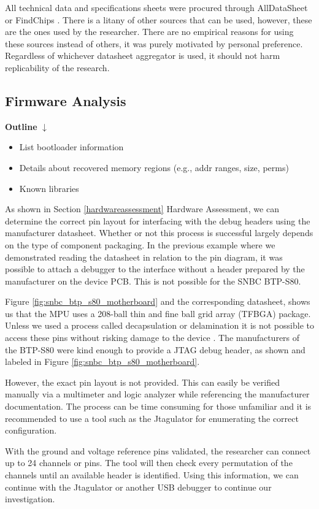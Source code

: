 All technical data and specifications sheets were procured through AllDataSheet or FindChips \autocite{ALLDATASHEETCOMElectronic,FindchipsElectronicPart}. There is a litany of other sources that can be used, however, these are the ones used by the researcher. There are no empirical reasons for using these sources instead of others, it was purely motivated by personal preference. Regardless of whichever datasheet aggregator is used, it should not harm replicability of the research.

\subsection{Firmware Analysis} \label{firmwareanalysis}

\textbf{Outline}
$\downarrow$

\begin{itemize}
    \item List bootloader information
    \item Details about recovered memory regions (e.g., addr ranges, size, perms)
    \item Known libraries
\end{itemize}

As shown in Section \ref{hardwareassessment} Hardware Assessment, we can determine the correct pin layout for interfacing with the debug headers using the manufacturer datasheet. Whether or not this process is successful largely depends on the type of component packaging. In the previous example where we demonstrated reading the datasheet in relation to the pin diagram, it was possible to attach a debugger to the interface without a header prepared by the manufacturer on the device PCB. This is not possible for the SNBC BTP-S80.

Figure \ref{fig:snbc_btp_s80_motherboard} and the corresponding datasheet, shows us that the MPU uses a 208-ball thin and fine ball grid array (TFBGA) package. Unless we used a process called decapsulation or delamination it is not possible to access these pins without risking damage to the device \autocite{sanchezlopezContributionStudyElectronic2015}. The manufacturers of the BTP-S80 were kind enough to provide a JTAG debug header, as shown and labeled in Figure \ref{fig:snbc_btp_s80_motherboard}.

However, the exact pin layout is not provided. This can easily be verified manually via a multimeter and logic analyzer while referencing the manufacturer documentation. The process can be time consuming for those unfamiliar and it is recommended to use a tool such as the Jtagulator \autocite{JTAGulator2023} for enumerating the correct configuration.

With the ground and voltage reference pins validated, the researcher can connect up to 24 channels or pins. The tool will then check every permutation of the channels until an available header is identified. Using this information, we can continue with the Jtagulator or another USB debugger to continue our investigation.
